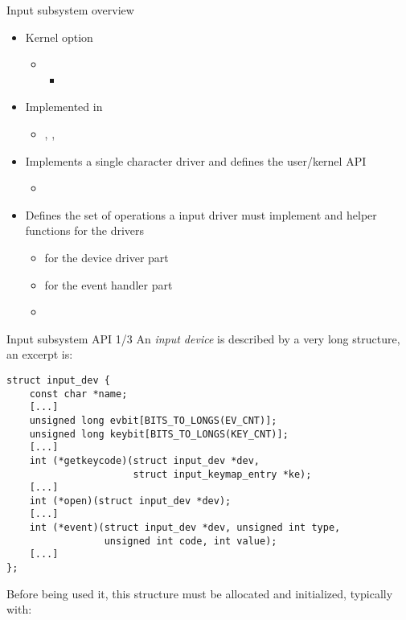 \begin{frame}{Input subsystem overview}
  \begin{itemize}
  \item Kernel option 
    \begin{itemize}
    \item {}
      \begin{itemize}
      \item {}
      \end{itemize}
    \end{itemize}
  \item Implemented in 
    \begin{itemize}
    \item {}, , 
    \end{itemize}
  \item Implements a single character driver and defines the
    user/kernel API
    \begin{itemize}
    \item {}
    \end{itemize}
  \item Defines the set of operations a input driver must implement
    and helper functions for the drivers
    \begin{itemize}
    \item {} for the device driver part
    \item {} for the event handler part
    \item  {}
    \end{itemize}
  \end{itemize}
\end{frame}

\begin{frame}[fragile]{Input subsystem API 1/3}
  An {\em input device} is described by a very long
   structure, an excerpt is:
  \begin{block}{}
  \begin{verbatim}
struct input_dev {
    const char *name;
    [...]
    unsigned long evbit[BITS_TO_LONGS(EV_CNT)];
    unsigned long keybit[BITS_TO_LONGS(KEY_CNT)];
    [...]
    int (*getkeycode)(struct input_dev *dev,
                      struct input_keymap_entry *ke);
    [...]
    int (*open)(struct input_dev *dev);
    [...]
    int (*event)(struct input_dev *dev, unsigned int type,
                 unsigned int code, int value);
    [...]
};
\end{verbatim}
\end{block}
  Before being used it, this structure must be allocated and
  initialized, typically with:
\end{frame}

